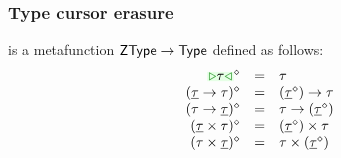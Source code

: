 \documentclass[formalism.tex]{subfiles}
\begin{document}
\subsubsection{Type cursor erasure}
\label{sec:untyped-type-cursor-erasure}
\judgbox{\ensuremath{\cursorErase{\ZTMV}}} is a metafunction ${\normalfont\textsf{ZType}} \to {\normalfont\textsf{Type}}$ defined as follows:
%
\newcommand{\cursorErasesToRow}[2]{\ensuremath{\cursorErase{#1} & = & #2}}
\[\begin{array}{rcl}
  \cursorErasesToRow{\ZTCursor{\TMV}}{\TMV} \\
  \cursorErasesToRow{(\ZTArrowL{\ZTMV}{\TMV})}{\TArrow{(\cursorErase{\ZTMV})}{\TMV}} \\
  \cursorErasesToRow{(\ZTArrowR{\TMV}{\ZTMV})}{\TArrow{\TMV}{(\cursorErase{\ZTMV})}} \\
  \cursorErasesToRow{(\ZTProdL{\ZTMV}{\TMV})}{\TProd{(\cursorErase{\ZTMV})}{\TMV}} \\
  \cursorErasesToRow{(\ZTProdR{\TMV}{\ZTMV})}{\TProd{\TMV}{(\cursorErase{\ZTMV})}} \\
\end{array}\]
\end{document}

